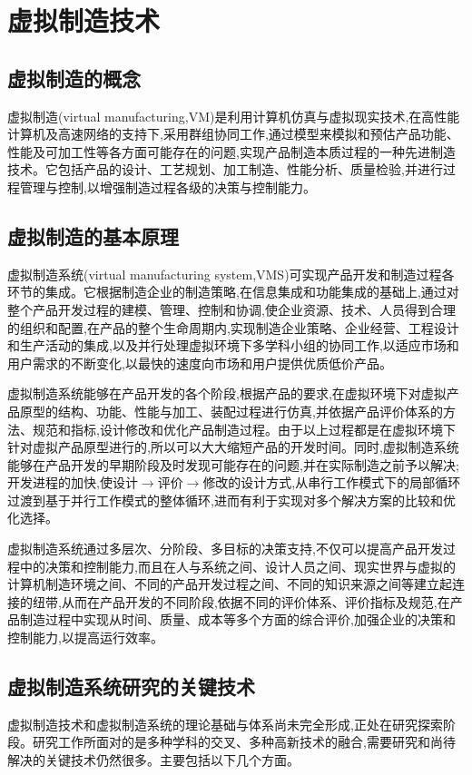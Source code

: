 \documentclass[UTF8]{ctexbook}
\newcommand{\◎}{\ensuremath{\bigcirc}}
\begin{document}
\section{虚拟制造技术}
\subsection{虚拟制造的概念}
虚拟制造(virtual manufacturing,VM)是利用计算机仿真与虚拟现实技术,在高性能计算机及高速网络的支持下,采用群组协同工作,通过模型来模拟和预估产品功能、性能及可加工性等各方面可能存在的问题,实现产品制造本质过程的一种先进制造技术。它包括产品的设计、工艺规划、加工制造、性能分析、质量检验,并进行过程管理与控制,以增强制造过程各级的决策与控制能力。

\subsection{虚拟制造的基本原理}
虚拟制造系统(virtual manufacturing system,VMS)可实现产品开发和制造过程各环节的集成。它根据制造企业的制造策略,在信息集成和功能集成的基础上,通过对整个产品开发过程的建模、管理、控制和协调,使企业资源、技术、人员得到合理的组织和配置,在产品的整个生命周期内,实现制造企业策略、企业经营、工程设计和生产活动的集成,以及并行处理虚拟环境下多学科小组的协同工作,以适应市场和用户需求的不断变化,以最快的速度向市场和用户提供优质低价产品。

虚拟制造系统能够在产品开发的各个阶段,根据产品的要求,在虚拟环境下对虚拟产品原型的结构、功能、性能与加工、装配过程进行仿真,并依据产品评价体系的方法、规范和指标,设计修改和优化产品制造过程。由于以上过程都是在虚拟环境下针对虚拟产品原型进行的,所以可以大大缩短产品的开发时间。同时,虚拟制造系统能够在产品开发的早期阶段及时发现可能存在的问题,并在实际制造之前予以解决;开发进程的加快,使设计$\to$评价$\to$修改的设计方式,从串行工作模式下的局部循环过渡到基于并行工作模式的整体循环,进而有利于实现对多个解决方案的比较和优化选择。

虚拟制造系统通过多层次、分阶段、多目标的决策支持,不仅可以提高产品开发过程中的决策和控制能力,而且在人与系统之间、设计人员之间、现实世界与虚拟的计算机制造环境之间、不同的产品开发过程之间、不同的知识来源之间等建立起连接的纽带,从而在产品开发的不同阶段,依据不同的评价体系、评价指标及规范,在产品制造过程中实现从时间、质量、成本等多个方面的综合评价,加强企业的决策和控制能力,以提高运行效率。

\subsection{虚拟制造系统研究的关键技术}
虚拟制造技术和虚拟制造系统的理论基础与体系尚未完全形成,正处在研究探索阶段。研究工作所面对的是多种学科的交叉、多种高新技术的融合,需要研究和尚待解决的关键技术仍然很多。主要包括以下几个方面。
\end{document}
